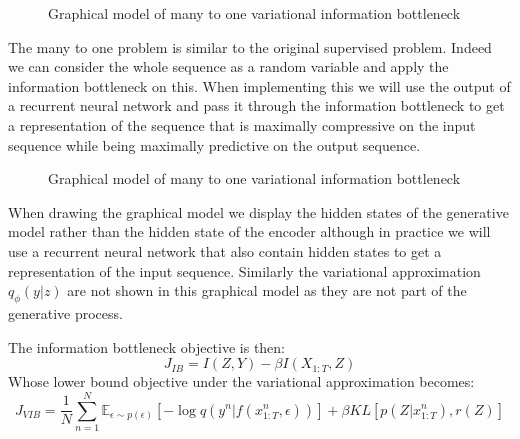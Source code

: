 \documentclass[11pt,oneside,openright]{report}
\begin{document}
\begin{figure}[H]
\centering
{}
\caption{Graphical model of many to one variational information bottleneck}
\end{figure}

The many to one problem is similar to the original supervised problem. Indeed we can consider the whole sequence as a random variable and apply the information bottleneck on this. When implementing this we will use the output of a recurrent neural network and pass it through the information bottleneck to get a representation of the sequence that is maximally compressive on the input sequence while being maximally predictive on the output sequence.

\begin{figure}[H]
\centering
{}
\caption{Graphical model of many to one variational information bottleneck }
\end{figure}

When drawing the graphical model we display the hidden states of the generative model rather than the hidden state of the encoder although in practice we will use a recurrent neural network that also contain hidden states to get a representation of the input sequence. Similarly the variational approximation $q_\phi(y|z)$ are not shown in this graphical model as they are not part of the generative process.

The information bottleneck objective is then:
$$ J_{IB} = I(Z, Y) - \beta I(X_{1:T}, Z)$$
Whose lower bound objective under the variational approximation becomes:
 $$ J_{VIB} = \frac{1}{N}  \sum_{n=1}^{N} \mathbb{E}_{\epsilon \sim p(\epsilon)}[- \log q(y^{n} |f(x_{1:T}^n, \epsilon))] + \beta KL[p(Z|x_{1:T}^n), r(Z)]$$
\end{document}

